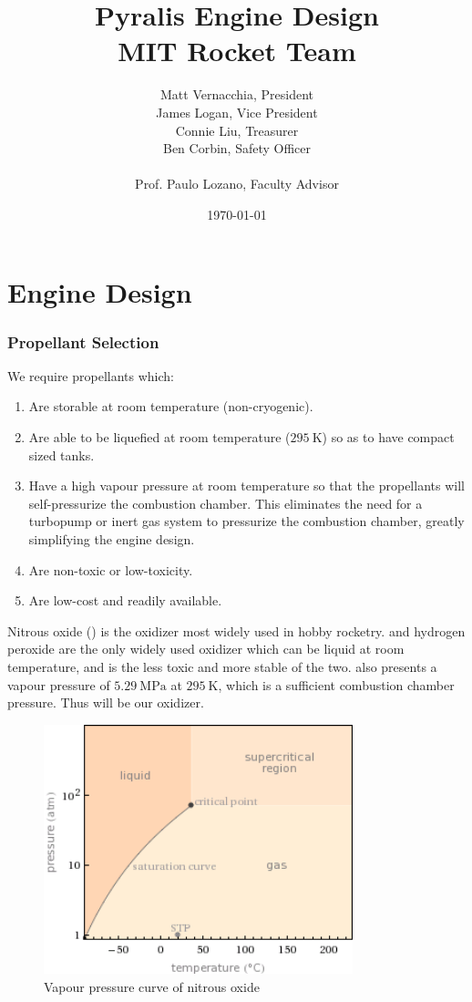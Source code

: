\documentclass{article}
\title{ Pyralis Engine Design \\ MIT Rocket Team} %
\author{Matt Vernacchia, President\\James Logan, Vice President\\Connie Liu, Treasurer\\Ben Corbin, Safety Officer
\\\\ Prof. Paulo Lozano, Faculty Advisor} %
\date{ \today } %
\begin{document}
\maketitle
\part*{Engine Design}
\section*{Propellant Selection}
We require propellants which:
\begin{enumerate}
\item Are storable at room temperature (non-cryogenic).
\item Are able to be liquefied at room temperature ($\SI{295}{\kelvin}$) so as to have compact sized tanks.
\item Have a high vapour pressure at room temperature so that the propellants will self-pressurize the combustion chamber. This eliminates the need for a turbopump or inert gas system to pressurize the combustion chamber, greatly simplifying the engine design.
\item Are non-toxic or low-toxicity.
\item Are low-cost and readily available.
\end{enumerate}
Nitrous oxide () is the oxidizer most widely used in hobby rocketry.  and hydrogen peroxide are the only widely used oxidizer which can be liquid at room temperature, and  is the less toxic and more stable of the two.  also presents a vapour pressure of $\SI{5.29}{\mega\pascal}$ at $\SI{295}{\kelvin}$, which is a sufficient combustion chamber pressure. Thus  will be our oxidizer.\\
\begin{figure}[h!]
\centering
\includegraphics[width = 0.8\textwidth]{n2o_vap.png}
\caption{Vapour pressure curve of nitrous oxide} 
\label{n2o_vap}
\end{figure}
\end{document}
